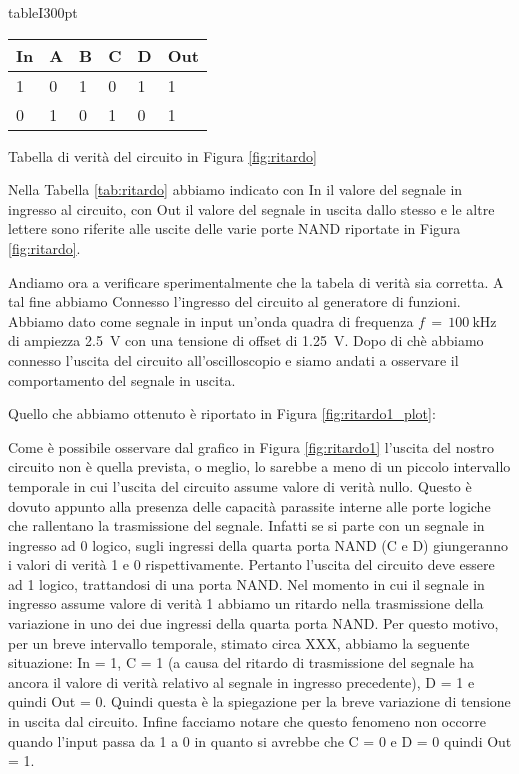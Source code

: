 \begin{wrapfloat}{table}{I}{300pt}
\centering
	\begin{tabular}{l | llll | l}
	\toprule
		In & A & B & C & D & Out\\
	\midrule
		1 & 0 & 1 & 0 & 1 & 1 \\
		0 & 1 & 0 & 1 & 0 & 1 \\
	\bottomrule
	\end{tabular}
	\caption{Tabella di verità del circuito in Figura \ref{fig:ritardo}}
	\label{tab:ritardo}
\end{wrapfloat}

Nella Tabella \ref{tab:ritardo} abbiamo indicato con In il valore del segnale in ingresso al circuito, con Out il valore del segnale in uscita dallo stesso e le altre lettere sono riferite alle uscite delle varie porte NAND riportate in Figura \ref{fig:ritardo}.

Andiamo ora a verificare sperimentalmente che la tabela di verità sia corretta. A tal fine abbiamo Connesso l'ingresso del circuito al generatore di funzioni. Abbiamo dato come segnale in input un'onda quadra di frequenza $f\,=\,\SI{100}{\kilo\hertz}$ di ampiezza \SI{2.5}{\volt} con una tensione di offset di \SI{1.25}{\volt}. Dopo di chè abbiamo connesso l'uscita del circuito all'oscilloscopio e siamo andati a osservare il comportamento del segnale in uscita.

Quello che abbiamo ottenuto è riportato in Figura \ref{fig:ritardo1_plot}:

Come è possibile osservare dal grafico in Figura \ref{fig:ritardo1} l'uscita del nostro circuito non è quella prevista, o meglio, lo sarebbe a meno di un piccolo intervallo temporale in cui l'uscita del circuito assume valore di verità nullo. Questo è dovuto appunto alla presenza delle capacità parassite interne alle porte logiche che rallentano la trasmissione del segnale. Infatti se si parte con un segnale in ingresso ad 0 logico, sugli ingressi della quarta porta NAND (C e D) giungeranno i valori di verità 1 e 0 rispettivamente. Pertanto l'uscita del circuito deve essere ad 1 logico, trattandosi di una porta NAND. Nel momento in cui il segnale in ingresso assume valore di verità 1 abbiamo un ritardo nella trasmissione della variazione in uno dei due ingressi della quarta porta NAND. Per questo motivo, per un breve intervallo temporale, stimato circa XXX, abbiamo la seguente situazione: In = 1, C = 1 (a causa del ritardo di trasmissione del segnale ha ancora il valore di verità relativo al segnale in ingresso precedente), D = 1 e quindi Out = 0. Quindi questa è la spiegazione per la breve variazione di tensione in uscita dal circuito. Infine facciamo notare che questo fenomeno non occorre quando l'input passa da 1 a 0 in quanto si avrebbe che C = 0 e D = 0 quindi Out = 1.

